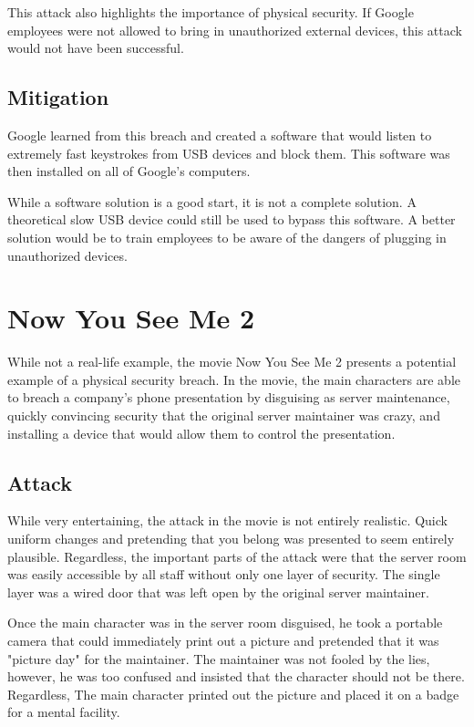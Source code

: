 \documentclass[acmlarge]{acmart}
\begin{document}
This attack also highlights the importance of physical security. If Google employees
were not allowed to bring in unauthorized external devices, this attack would not
have been successful.

\subsection{Mitigation}
Google learned from this breach and created a software that would listen to extremely
fast keystrokes from USB devices and block them. This software was then installed
on all of Google's computers.

While a software solution is a good start, it is not a complete solution. A theoretical
slow USB device could still be used to bypass this software. A better solution would
be to train employees to be aware of the dangers of plugging in unauthorized devices.

\section{Now You See Me 2}
While not a real-life example, the movie Now You See Me 2 \cite{NowYouSeeMe2} presents
a potential example of a physical security breach. In the movie, the main characters
are able to breach a company's phone presentation by disguising as server maintenance,
quickly convincing security that the original server maintainer was crazy, and 
installing a device that would allow them to control the presentation.

\subsection{Attack}
While very entertaining, the attack in the movie is not entirely realistic. Quick uniform
changes and pretending that you belong was presented to seem entirely plausible. Regardless,
the important parts of the attack were that the server room was easily accessible by all staff
without only one layer of security. The single layer was a wired door that was left open
by the original server maintainer.

Once the main character was in the server room disguised, he took a portable camera that could
immediately print out a picture and pretended that it was "picture day" for the maintainer.
The maintainer was not fooled by the lies, however, he was too confused and insisted that the
character should not be there. Regardless, The main character printed out the picture and
placed it on a badge for a mental facility.
\end{document}
